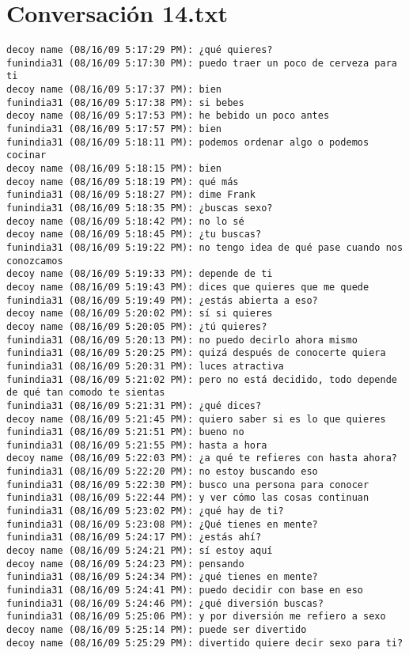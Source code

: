 \section{Conversaci\'on 14.txt}

\begin{verbatim}
decoy name (08/16/09 5:17:29 PM): ¿qué quieres?
funindia31 (08/16/09 5:17:30 PM): puedo traer un poco de cerveza para ti
decoy name (08/16/09 5:17:37 PM): bien
funindia31 (08/16/09 5:17:38 PM): si bebes
decoy name (08/16/09 5:17:53 PM): he bebido un poco antes
funindia31 (08/16/09 5:17:57 PM): bien
funindia31 (08/16/09 5:18:11 PM): podemos ordenar algo o podemos cocinar
decoy name (08/16/09 5:18:15 PM): bien
decoy name (08/16/09 5:18:19 PM): qué más
funindia31 (08/16/09 5:18:27 PM): dime Frank
funindia31 (08/16/09 5:18:35 PM): ¿buscas sexo?
decoy name (08/16/09 5:18:42 PM): no lo sé
decoy name (08/16/09 5:18:45 PM): ¿tu buscas?
funindia31 (08/16/09 5:19:22 PM): no tengo idea de qué pase cuando nos conozcamos
decoy name (08/16/09 5:19:33 PM): depende de ti
decoy name (08/16/09 5:19:43 PM): dices que quieres que me quede
funindia31 (08/16/09 5:19:49 PM): ¿estás abierta a eso?
decoy name (08/16/09 5:20:02 PM): sí si quieres
decoy name (08/16/09 5:20:05 PM): ¿tú quieres?
funindia31 (08/16/09 5:20:13 PM): no puedo decirlo ahora mismo
funindia31 (08/16/09 5:20:25 PM): quizá después de conocerte quiera
funindia31 (08/16/09 5:20:31 PM): luces atractiva
funindia31 (08/16/09 5:21:02 PM): pero no está decidido, todo depende de qué tan comodo te sientas
funindia31 (08/16/09 5:21:31 PM): ¿qué dices?
decoy name (08/16/09 5:21:45 PM): quiero saber si es lo que quieres
funindia31 (08/16/09 5:21:51 PM): bueno no
funindia31 (08/16/09 5:21:55 PM): hasta a hora
decoy name (08/16/09 5:22:03 PM): ¿a qué te refieres con hasta ahora?
funindia31 (08/16/09 5:22:20 PM): no estoy buscando eso
funindia31 (08/16/09 5:22:30 PM): busco una persona para conocer
funindia31 (08/16/09 5:22:44 PM): y ver cómo las cosas continuan
funindia31 (08/16/09 5:23:02 PM): ¿qué hay de ti?
funindia31 (08/16/09 5:23:08 PM): ¿Qué tienes en mente?
funindia31 (08/16/09 5:24:17 PM): ¿estás ahí?
decoy name (08/16/09 5:24:21 PM): sí estoy aquí
decoy name (08/16/09 5:24:23 PM): pensando
funindia31 (08/16/09 5:24:34 PM): ¿qué tienes en mente?
funindia31 (08/16/09 5:24:41 PM): puedo decidir con base en eso
funindia31 (08/16/09 5:24:46 PM): ¿qué diversión buscas?
funindia31 (08/16/09 5:25:06 PM): y por diversión me refiero a sexo
decoy name (08/16/09 5:25:14 PM): puede ser divertido
decoy name (08/16/09 5:25:29 PM): divertido quiere decir sexo para ti?

\end{verbatim}
